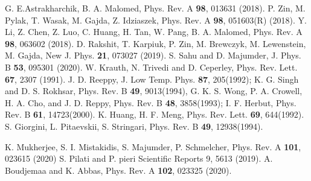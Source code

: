 \documentclass[amsmath,amssymb,lengthcheck,aps,prl] {revtex4}
\begin{document}
\begin{thebibliography}{50}
 G. E.Astrakharchik, B. A. Malomed, Phys. Rev. A \textbf{98}, 013631 (2018).
 P. Zin, M. Pylak, T. Wasak, M. Gajda, Z. Idziaszek, Phys. Rev. A \textbf{98}, 051603(R) (2018).
 Y. Li, Z. Chen, Z. Luo, C. Huang, H. Tan, W. Pang, B. A. Malomed, Phys. Rev. A {\bf 98}, 063602 (2018).
 D. Rakshit, T. Karpiuk, P. Zin, M. Brewczyk, M. Lewenstein, M. Gajda, New J. Phys. \textbf{21}, 073027 (2019).
 S. Sahu and D. Majumder, J. Phys. B {\bf 53}, 095301 (2020).
 W. Krauth, N. Trivedi and D. Ceperley, Phys. Rev. Lett. {\bf 67}, 2307 (1991).
 J. D. Reeppy,  J. Low Temp. Phys. {\bf 87}, 205(1992); %
 K. G. Singh and D. S. Rokhsar, Phys. Rev. B {\bf 49}, 9013(1994), %
G. K. S. Wong, P. A. Crowell, H. A. Cho, and J. D. Reppy, Phys. Rev. B {\bf 48}, 3858(1993); %
I. F. Herbut, Phys. Rev. B {\bf 61}, 14723(2000). %
 K. Huang, H. F. Meng, Phys. Rev. Lett. {\bf 69}, 644(1992).
 S. Giorgini, L. Pitaevskii, S. Stringari, Phys. Rev. B {\bf 49}, 12938(1994). 

 K. Mukherjee, S. I. Mistakidis, S. Majumder, P. Schmelcher, Phys. Rev. A {\bf 101}, 023615 (2020)
 S. Pilati and P. pieri Scientific Reports 9, 5613 (2019).
 A. Boudjemaa and K. Abbas, Phys. Rev. A {\bf 102}, 023325 (2020).


\end{thebibliography}
\end{document}
